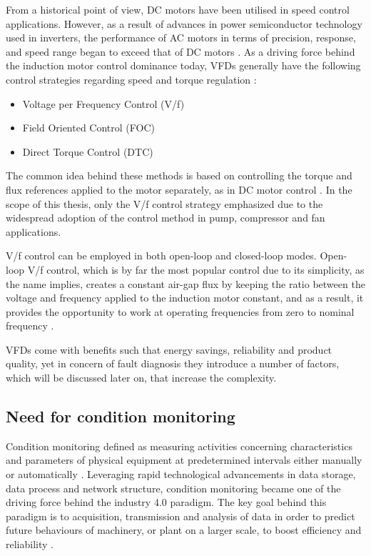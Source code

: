 From a historical point of view, DC motors have been utilised in speed control applications. However, as a result of advances in power semiconductor technology used in inverters, the performance of AC motors in terms of precision, response, and speed range began to exceed that of DC motors \cite{doe2008improving,mikami2011historical}. As a driving force behind the induction motor control dominance today, VFDs generally have the following control strategies regarding speed and torque regulation \cite{weg,danfoss}:

\begin{itemize}
	\item Voltage per Frequency Control (V/f)
	\item Field Oriented Control (FOC)
	\item Direct Torque Control (DTC)
\end{itemize}

The common idea behind these methods is based on controlling the torque and flux references applied to the motor separately, as in DC motor control \cite{faiz2017fault}. In the scope of this thesis, only the V/f control strategy emphasized due to the widespread adoption of the control method in pump, compressor and fan applications. 

V/f control can be employed in both open-loop and closed-loop modes. Open-loop V/f control, which is by far the most popular control due to its simplicity, as the name implies, creates a constant air-gap flux by keeping the ratio between the voltage and frequency applied to the induction motor constant, and as a result, it provides the opportunity to work at operating frequencies from zero to nominal frequency \cite{bose2002modern}. 

VFDs come with benefits such that energy savings, reliability and product quality, yet in concern of fault diagnosis they introduce a number of factors, which will be discussed later on, that increase the complexity. 

\subsection{Need for condition monitoring}

Condition monitoring defined as measuring activities concerning characteristics and parameters of physical equipment at predetermined intervals either manually or automatically \cite{en201713306}. Leveraging rapid technological advancements in data storage, data process and network structure, condition monitoring became one of the driving force behind the industry 4.0 paradigm. The key goal behind this paradigm is to acquisition, transmission and analysis of data in order to predict future behaviours of machinery, or plant on a larger scale, to boost efficiency and reliability \cite{lughofer2019prologue,RUIZSARMIENTO}. 

